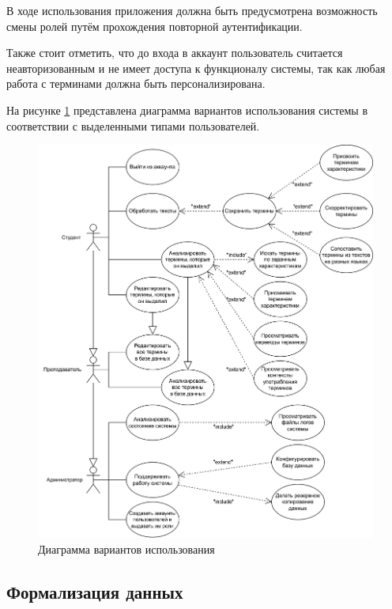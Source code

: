 В ходе использования приложения должна быть предусмотрена возможность смены ролей путём прохождения повторной аутентификации.

Также стоит отметить, что до входа в аккаунт пользователь считается неавторизованным и не имеет доступа к функционалу системы, так как любая работа с терминами должна быть персонализирована.

На рисунке \ref{fig:use-case} представлена диаграмма вариантов использования системы в соответствии с выделенными типами пользователей.

\begin{figure}[h]
	\centering
	\includegraphics[width=\textwidth ]{img/Use-case/Use-case.drawio.png}
	\caption{Диаграмма вариантов использования}
	\label{fig:use-case}
\end{figure} 

\clearpage



\subsection{Формализация данных}

